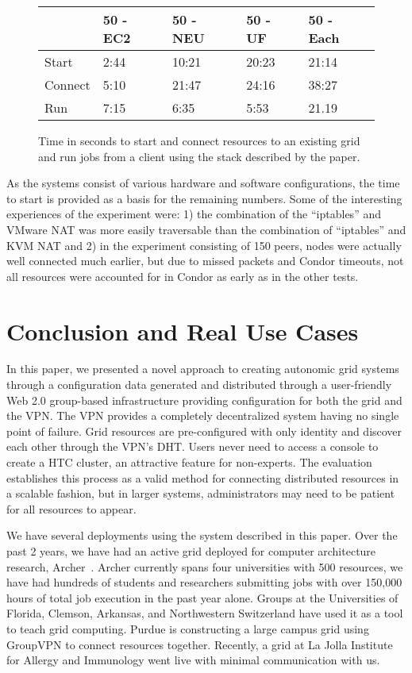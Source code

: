 \documentclass{sig-alternate}
\begin{document}
\begin{figure}[ht]
\setlength{\itemsep}{0pt}
\setlength{\parskip}{0pt}
\centering
\begin{tabular}[c]{|m{1.2cm}||m{1.3cm}|m{1.3cm}|m{1.3cm}|m{1.3cm}|} \hline
& 50 - EC2 & 50 - NEU & 50 - UF & 50 - Each \\ \hline\hline
Start & 2:44 & 10:21 & 20:23 & 21:14 \\ \hline
Connect & 5:10 & 21:47 & 24:16 & 38:27\\ \hline
Run & 7:15 & 6:35 & 5:53 & 21.19 \\ \hline
\end{tabular}
\caption{Time in seconds to start and connect resources to an existing
grid and run jobs from a client using the stack described by the paper.}
\label{fig:results}
\end{figure}

As the systems consist of various hardware and software configurations, the
time to start is provided as a basis for the remaining numbers.  Some of the
interesting experiences of the experiment were:  1) the combination of the
``iptables'' and VMware NAT was more easily traversable than the combination
of ``iptables'' and KVM NAT and 2) in the experiment consisting of 150 peers,
nodes were actually well connected much earlier, but due to missed packets and
Condor timeouts, not all resources were accounted for in Condor as early as in
the other tests.

\section{Conclusion and Real Use Cases}
\label{conclusion}
In this paper, we presented a novel approach to creating autonomic grid systems
through a configuration data generated and distributed through a user-friendly
Web 2.0 group-based infrastructure providing configuration for both the grid
and the VPN.  The VPN provides a completely decentralized system having no
single point of failure.  Grid resources are pre-configured with only identity
and discover each other through the VPN's DHT.  Users never need to access a
console to create a HTC cluster, an attractive feature for non-experts.  The
evaluation establishes this process as a valid method for connecting distributed
resources in a scalable fashion, but in larger systems, administrators may need
to be patient for all resources to appear.

We have several deployments using the system described in this paper.  Over
the past 2 years, we have had an active grid deployed for computer architecture
research, Archer~\cite{archer}.  Archer currently spans four universities with
500 resources, we have had hundreds of students and researchers submitting jobs
with over 150,000 hours of total job execution in the past year alone.  Groups
at the Universities of Florida, Clemson, Arkansas, and Northwestern Switzerland
have used it as a tool to teach grid computing.  Purdue is constructing a large
campus grid using GroupVPN to connect resources together.  Recently, a grid at
La Jolla Institute for Allergy and Immunology went live with minimal
communication with us.


\small{

\suppressfloats
}
\end{document}
